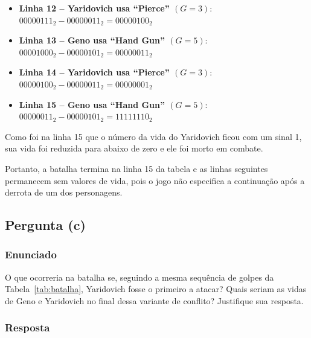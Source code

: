 \documentclass[12pt]{article}
\begin{document}
\begin{itemize}
\item \textbf{Linha 12 – Yaridovich usa ``Pierce'' $(G=3)$}: $00000111_2 - 00000011_2 = 00000100_2$
\vspace{0.1cm}

\item \textbf{Linha 13 – Geno usa ``Hand Gun'' $(G=5)$}: $00001000_2 - 00000101_2 = 00000011_2$
\vspace{0.1cm}

\item \textbf{Linha 14 – Yaridovich usa ``Pierce'' $(G=3)$}: $00000100_2 - 00000011_2 = 00000001_2$
\vspace{0.1cm}

\item \textbf{Linha 15 – Geno usa ``Hand Gun'' $(G=5)$}: $00000011_2 - 00000101_2 = 11111110_2$
\vspace{0.1cm}

\end{itemize}

Como foi na linha 15 que o número da vida do Yaridovich ficou com um sinal 1, sua vida foi reduzida para abaixo de zero e ele foi morto em combate.

Portanto, a batalha termina na linha 15 da tabela e as linhas
seguintes permanecem sem valores de vida, pois o jogo não especifica a continuação após a derrota de um dos personagens.

\subsection{Pergunta (c)}
\subsubsection*{Enunciado}

O que ocorreria na batalha se, seguindo a mesma sequência de golpes da Tabela~\ref{tab:batalha}, Yaridovich fosse o primeiro a atacar? Quais seriam as vidas de Geno e Yaridovich no final dessa variante de conflito? Justifique sua resposta.

\subsubsection*{Resposta}
\end{document}
